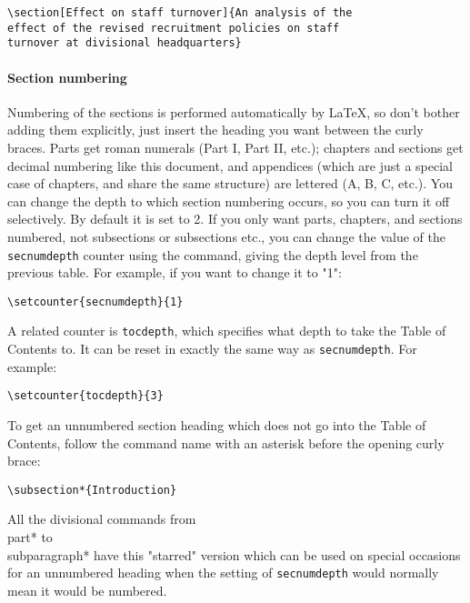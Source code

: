 \begin{lstlisting}
\section[Effect on staff turnover]{An analysis of the
effect of the revised recruitment policies on staff
turnover at divisional headquarters}
\end{lstlisting}

\paragraph{ Section numbering }
Numbering of the sections is performed automatically by LaTeX, so don't bother
adding them explicitly, just insert the heading you want between the curly
braces.  Parts get roman numerals (Part I, Part II, etc.); chapters and
sections get decimal numbering like this document, and appendices (which are
just a special case of chapters, and share the same structure) are lettered (A,
B, C, etc.). You can change the depth to which section numbering occurs, so you
can turn it off selectively. By default it is set to 2. If you only want parts,
chapters, and sections numbered, not subsections or subsections etc., you can
change the value of the \texttt{secnumdepth} counter using the
\texttt{\setcounter} command, giving the depth level from the previous table.
For example, if you want to change it to "1":
\begin{lstlisting}
\setcounter{secnumdepth}{1}
\end{lstlisting}

A related counter is \texttt{tocdepth}, which specifies what depth to take the
Table of Contents to. It can be reset in exactly the same way as
\texttt{secnumdepth}. For example:
\begin{lstlisting}
\setcounter{tocdepth}{3}
\end{lstlisting}

To get an unnumbered section heading which does not go into the Table of
Contents, follow the command name with an asterisk before the opening curly
brace:
\begin{lstlisting}
\subsection*{Introduction}
\end{lstlisting}

All the divisional commands from \\part* to \\subparagraph* have this "starred"
version which can be used on special occasions for an unnumbered heading when
the setting of \texttt{secnumdepth} would normally mean it would be numbered.

